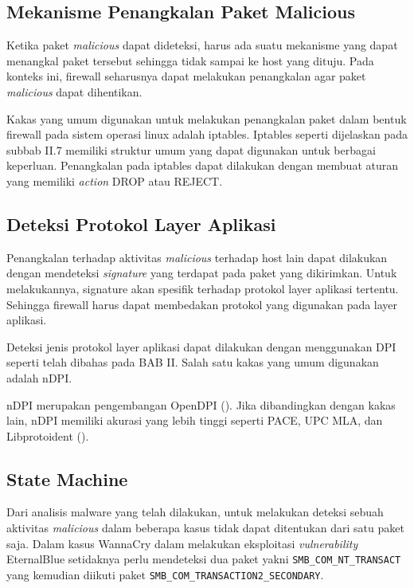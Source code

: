 \subsection{Mekanisme Penangkalan Paket Malicious}

Ketika paket \textit{malicious} dapat dideteksi, harus ada suatu mekanisme yang dapat menangkal paket tersebut sehingga tidak sampai ke host yang dituju. Pada konteks ini, firewall seharusnya dapat melakukan penangkalan agar paket \textit{malicious} dapat dihentikan.

Kakas yang umum digunakan untuk melakukan penangkalan paket dalam bentuk firewall pada sistem operasi linux adalah iptables. Iptables seperti dijelaskan pada subbab II.7 memiliki struktur umum yang dapat digunakan untuk berbagai keperluan. Penangkalan pada iptables dapat dilakukan dengan membuat aturan yang memiliki \textit{action} DROP atau REJECT.

\subsection{Deteksi Protokol Layer Aplikasi}

Penangkalan terhadap aktivitas \textit{malicious} terhadap host lain dapat dilakukan dengan mendeteksi \textit{signature} yang terdapat pada paket yang dikirimkan. Untuk melakukannya, signature akan spesifik terhadap protokol layer aplikasi tertentu. Sehingga firewall harus dapat membedakan protokol yang digunakan pada layer aplikasi.

Deteksi jenis protokol layer aplikasi dapat dilakukan dengan menggunakan DPI seperti telah dibahas pada BAB II. Salah satu kakas yang umum digunakan adalah nDPI.

nDPI merupakan pengembangan OpenDPI (\cite{deri2014ndpi}). Jika dibandingkan dengan kakas lain, nDPI memiliki akurasi yang lebih tinggi seperti PACE, UPC MLA, dan Libprotoident (\cite{bujlow2013comparison}).

\subsection{State Machine}

Dari analisis malware yang telah dilakukan, untuk melakukan deteksi sebuah aktivitas \textit{malicious} dalam beberapa kasus tidak dapat ditentukan dari satu paket saja. Dalam kasus WannaCry dalam melakukan eksploitasi \textit{vulnerability} EternalBlue setidaknya perlu mendeteksi dua paket yakni \verb|SMB_COM_NT_TRANSACT| yang kemudian diikuti paket \verb|SMB_COM_TRANSACTION2_SECONDARY|.

